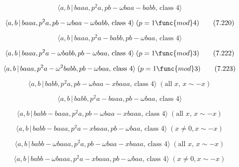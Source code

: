 \documentclass[10pt]{article}
\begin{document}
\begin{equation}
\langle a,b\,|\,baaa,p^{2}a,pb-\omega baa-babb,\,\text{class }4\rangle 
\tag{7.219}
\end{equation}

\begin{equation}
\langle a,b\,|\,baaa,p^{2}a,pb-\omega baa-\omega babb,\,\text{class }%
4\rangle \;(p=1\func{mod}4)  \tag{7.220}
\end{equation}

\begin{equation}
\langle a,b\,|\,baaa,p^{2}a-babb,pb-\omega baa,\,\text{class }4\rangle 
\tag{7.221}
\end{equation}

\begin{equation}
\langle a,b\,|\,baaa,p^{2}a-\omega babb,pb-\omega baa,\,\text{class }%
4\rangle \;(p=1\func{mod}3)  \tag{7.222}
\end{equation}

\begin{equation}
\langle a,b\,|\,baaa,p^{2}a-\omega ^{2}babb,pb-\omega baa,\,\text{class }%
4\rangle \;(p=1\func{mod}3)  \tag{7.223}
\end{equation}

\begin{equation}
\langle a,b\,|\,babb,p^{2}a,pb-\omega baa-xbaaa,\,\text{class }4\rangle \;(%
\text{all }x,\,x\sim -x)  \tag{7.224}
\end{equation}

\begin{equation}
\langle a,b\,|\,babb,p^{2}a-baaa,pb-\omega baa,\,\text{class }4\rangle 
\tag{7.225}
\end{equation}

\begin{equation}
\langle a,b\,|\,babb-baaa,p^{2}a,pb-\omega baa-xbaaa,\,\text{class }4\rangle
\;(\text{all }x,\,x\sim -x)  \tag{7.226}
\end{equation}

\begin{equation}
\langle a,b\,|\,babb-baaa,p^{2}a-xbaaa,pb-\omega baa,\,\text{class }4\rangle
\;(x\neq 0,x\sim -x)  \tag{7.227}
\end{equation}

\begin{equation}
\langle a,b\,|\,babb-\omega baaa,p^{2}a,pb-\omega baa-xbaaa,\,\text{class }%
4\rangle \;(\text{all }x,\,x\sim -x)  \tag{7.228}
\end{equation}

\begin{equation}
\langle a,b\,|\,babb-\omega baaa,p^{2}a-xbaaa,pb-\omega baa,\,\text{class }%
4\rangle \;(x\neq 0,x\sim -x)  \tag{7.229}
\end{equation}
\end{document}
